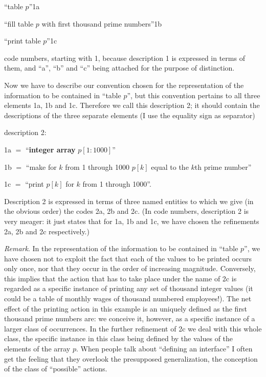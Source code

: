 \noindent
``table $p$''\hfill 1a

\noindent
``fill table $p$ with first thousand prime numbers''\hfill 1b

\noindent
``print table $p$''\hfill 1c

\noindent
code numbers, starting with 1, because description 1 is expressed in terms of them, and ``a'', ``b'' and ``c'' being attached for the purpose of distinction.

Now we have to describe our convention chosen for the representation of the information to be contained in ``table $p$'', but this convention pertains to all three elements 1a, 1b and 1c. Therefore we call this description 2; it should contain the descriptions of the three separate elements (I use the equality sign as separator)
\medskip

\noindent
description 2:
\nopagebreak

\noindent
1a $=$ ``\textbf{integer array} $p[1 : 1000]$''

\noindent
1b $=$ ``make for $k$ from 1 through 1000 $p[k]$ equal to the $k$th prime number''

\noindent
1c $=$ ``print $p[k]$ for $k$ from 1 through 1000''.

Description 2 is expressed in terms of three named entities to which we give (in the obvious order) the codes 2a, 2b and 2c. (In code numbers, description 2 is very meager: it just states that for 1a, 1b and 1c, we have chosen the refinements 2a, 2b and 2c respectively.)

\noindent
\textit{Remark}. In the representation of the information to be contained in ``table $p$'', we have chosen not to exploit the fact that each of the values to be printed occurs only once, nor that they occur in the order of increasing magnitude. Conversely, this implies that the action that has to take place under the name of 2c is regarded as a specific instance of printing any set of thousand integer values (it could be a table of monthly wages of thousand numbered employees!). The net effect of the printing action in this example is an uniquely defined as the first thousand prime numbers are: we conceive it, however, as a specific instance of a larger class of occurrences. In the further refinement of 2c we deal with this whole class, the specific instance in this class being defined by the values of the elements of the array $p$. When people talk about ``defining an interface'' I often get the feeling that they overlook the presupposed generalization, the conception of the class of ``possible'' actions.

